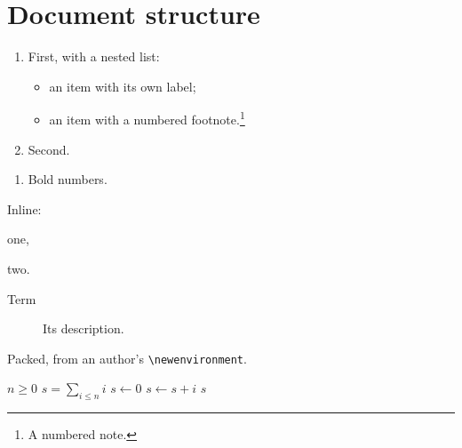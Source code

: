 \section{Document structure}\label{sec:structure}
\begin{enumerate}[label=(\roman*)]
  \item First, with a nested list:
    \begin{itemize}[leftmargin=*]
      \item[$\star$] an item with its own label;
      \item an item with a numbered footnote.\footnote{A numbered note.}%
    \end{itemize}
  \item Second.
\end{enumerate}
\begin{enumerate}[label=\textbf{\arabic*.}]\item Bold numbers.\end{enumerate}
Inline: \begin{enumerate*}[label=(\alph*)] \item one, \item two. \end{enumerate*}
\begin{description}\item[Term] Its description.\end{description}
\begin{gmpacked}\item Packed, from an author's \verb|\newenvironment|.\end{gmpacked}
\begin{table}[t]
\centering\small
\caption{Benchmark comparison.}\label{tab:results}
\end{table}
\begin{algorithm}[h]
\caption{Summing a range}\label{alg:sum}
\begin{algorithmic}[1]
\Require $n \ge 0$
\Ensure $s = \sum_{i \le n} i$
\State $s \gets 0$
  \State $s \gets s + i$\EndIf
\EndFor
{}
\State \Return $s$
\end{algorithmic}
\end{algorithm}
